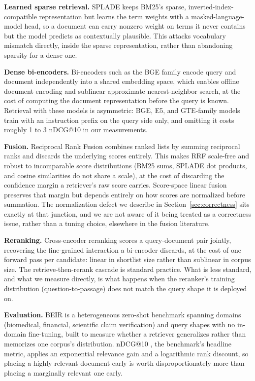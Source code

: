 \documentclass[11pt]{article}
\begin{document}
\textbf{Learned sparse retrieval.} SPLADE \citep{formal2021splade} keeps BM25's sparse, inverted-index-compatible representation but learns the term weights with a masked-language-model head, so a document can carry nonzero weight on terms it never contains but the model predicts as contextually plausible. This attacks vocabulary mismatch directly, inside the sparse representation, rather than abandoning sparsity for a dense one.

\textbf{Dense bi-encoders.} Bi-encoders such as the BGE family \citep{bge2023} encode query and document independently into a shared embedding space, which enables offline document encoding and sublinear approximate nearest-neighbor search, at the cost of computing the document representation before the query is known. Retrieval with these models is asymmetric: BGE, E5, and GTE-family models train with an instruction prefix on the query side only, and omitting it costs roughly 1 to 3 nDCG@10 in our measurements.

\textbf{Fusion.} Reciprocal Rank Fusion \citep{cormack2009reciprocal} combines ranked lists by summing reciprocal ranks and discards the underlying scores entirely. This makes RRF scale-free and robust to incomparable score distributions (BM25 sums, SPLADE dot products, and cosine similarities do not share a scale), at the cost of discarding the confidence margin a retriever's raw score carries. Score-space linear fusion preserves that margin but depends entirely on how scores are normalized before summation. The normalization defect we describe in Section~\ref{sec:correctness} sits exactly at that junction, and we are not aware of it being treated as a correctness issue, rather than a tuning choice, elsewhere in the fusion literature.

\textbf{Reranking.} Cross-encoder reranking \citep{nogueira2019passage} scores a query-document pair jointly, recovering the fine-grained interaction a bi-encoder discards, at the cost of one forward pass per candidate: linear in shortlist size rather than sublinear in corpus size. The retrieve-then-rerank cascade is standard practice. What is less standard, and what we measure directly, is what happens when the reranker's training distribution (question-to-passage) does not match the query shape it is deployed on.

\textbf{Evaluation.} BEIR \citep{thakur2021beir} is a heterogeneous zero-shot benchmark spanning domains (biomedical, financial, scientific claim verification) and query shapes with no in-domain fine-tuning, built to measure whether a retriever generalizes rather than memorizes one corpus's distribution. nDCG@10 \citep{jarvelin2002cumulated}, the benchmark's headline metric, applies an exponential relevance gain and a logarithmic rank discount, so placing a highly relevant document early is worth disproportionately more than placing a marginally relevant one early.
\end{document}
